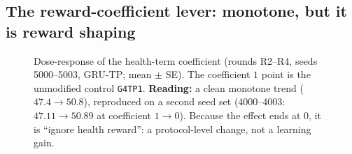 \documentclass[10pt,a4paper]{article}
\newcommand{\p}[1]{\texttt{\small #1}}
\begin{document}
\subsection{The reward-coefficient lever: monotone, but it is reward shaping}
\begin{figure}[H]\centering
{}
\caption{Dose-response of the health-term coefficient (rounds R2--R4, seeds 5000--5003, GRU-TP; mean $\pm$ SE). The coefficient $1$ point is the unmodified control \p{G4TP1}.
\textbf{Reading:} a clean monotone trend ($47.4\to50.8$), reproduced on a second seed set (4000--4003: $47.11\to50.89$ at coefficient $1\to0$). Because the effect ends at 0, it is ``ignore health reward'': a protocol-level change, not a learning gain.}
\label{fig:dose}
\end{figure}
\end{document}
